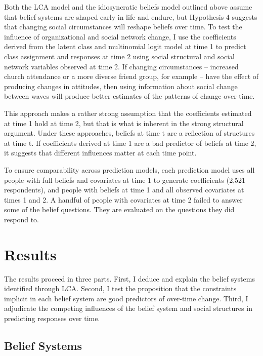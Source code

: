 \documentclass[12pt,]{article}
\begin{document}
Both the LCA model and the idiosyncratic beliefs model outlined above assume that belief systems are shaped early in life and endure, but Hypothesis 4 suggests that changing social circumstances will reshape beliefs over time. To test the influence of organizational and social network change, I use the coefficients derived from the latent class and multinomial logit model at time 1 to predict class assignment and responses at time 2 using social structural and social network variables observed at time 2. If changing circumstances -- increased church attendance or a more diverse friend group, for example -- have the effect of producing changes in attitudes, then using information about social change between waves will produce better estimates of the patterns of change over time.

This approach makes a rather strong assumption that the coefficients estimated at time 1 hold at time 2, but that is what is inherent in the strong structural argument. Under these approaches, beliefs at time t are a reflection of structures at time t. If coefficients derived at time 1 are a bad predictor of beliefs at time 2, it suggests that different influences matter at each time point.

To ensure comparability across prediction models, each prediction model uses all people with full beliefs and covariates at time 1 to generate coefficients (2,521 respondents), and people with beliefs at time 1 and all observed covariates at times 1 and 2. A handful of people with covariates at time 2 failed to answer some of the belief questions. They are evaluated on the questions they did respond to.

\hypertarget{results}{%
\section{Results}\label{results}}

The results proceed in three parts. First, I deduce and explain the belief systems identified through LCA. Second, I test the proposition that the constraints implicit in each belief system are good predictors of over-time change. Third, I adjudicate the competing influences of the belief system and social structures in predicting responses over time.

\hypertarget{belief-systems-1}{%
\subsection{Belief Systems}\label{belief-systems-1}}
\end{document}
